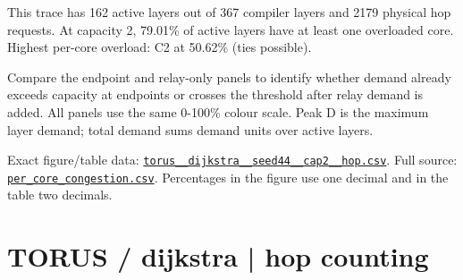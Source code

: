 \documentclass[10pt,a4paper]{article}
\begin{document}
This trace has 162 active layers out of 367 compiler layers and 2179 physical hop requests. At capacity 2, 79.01\% of active layers have at least one overloaded core. Highest per-core overload: C2 at 50.62\% (ties possible).\par
Compare the endpoint and relay-only panels to identify whether demand already exceeds capacity at endpoints or crosses the threshold after relay demand is added. All panels use the same 0-100\% colour scale. Peak D is the maximum layer demand; total demand sums demand units over active layers.\par
Exact figure/table data: \href{\detokenize{file:///home/dhruv-pansuriya/Documents/BTP/Compiler-Driven-ACE/output/pdf/qaoa_methods_congestion/tables/torus__dijkstra__seed44__cap2__hop.csv}}{\nolinkurl{torus__dijkstra__seed44__cap2__hop.csv}}. Full source: \href{\detokenize{file:///home/dhruv-pansuriya/Documents/BTP/Compiler-Driven-ACE/results/qaoa_2seed_2026-10-26/congestion/per_core_congestion.csv}}{\nolinkurl{per_core_congestion.csv}}. Percentages in the figure use one decimal and in the table two decimals.\par
\clearpage
\section*{TORUS / dijkstra | hop counting}
\end{document}
